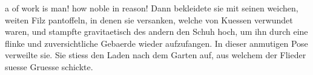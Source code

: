 \documentclass{scrbook}
\begin{document}
\beginnumbering      
\pstart
{} a  of work is man! how noble in reason! 
\pend
\pstart
Dann bekleidete sie mit seinen weichen, weiten Filz
pantoffeln, in denen sie versanken, 
welche von Kuessen verwundet waren, und stampfte gravitaetisch
 des andern den Schuh hoch, um ihn durch eine flinke und zuversichtliche Gebaerde wieder aufzufangen. In dieser anmutigen Pose verweilte sie. Sie stiess den Laden nach dem Garten auf, aus welchem der Flieder suesse Gruesse schickte.
\pend



\endnumbering
\end{document}
